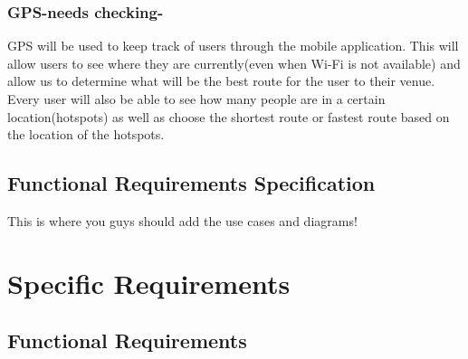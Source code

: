 \documentclass{article}
\begin{document}
\subsubsection{GPS-needs checking-}
GPS will be used to keep track of users through the mobile application. This will allow users to see where they are currently(even when Wi-Fi is not available) and allow us to determine what will be the best route for the user to their venue. Every user will also be able to see how many people are in a certain location(hotspots) as well as choose the shortest route or fastest route based on the location of the hotspots.
\subsection {Functional Requirements Specification}
This is where you guys should add the use cases and diagrams!
\newpage
\centering
\section{Specific Requirements}
\subsection{Functional Requirements}
\end{document}
